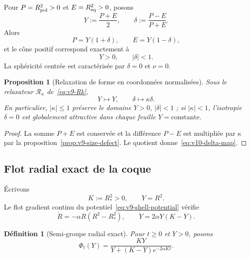 \documentclass[11pt,a4paper]{article}
\newtheorem{proposition}[theorem]{Proposition}
\newtheorem{definition}[theorem]{Définition}
\begin{document}
Pour $P=R_{\rm pol}^2>0$ et $E=R_{\rm eq}^2>0$, posons
\begin{equation}\label{eq:v10-Ydelta}
 Y:=\frac{P+E}{2},\qquad
 \delta:=\frac{P-E}{P+E}.
\end{equation}
Alors
\begin{equation}\label{eq:v10-PEfromYd}
 P=Y(1+\delta),\qquad E=Y(1-\delta),
\end{equation}
et le cône positif correspond exactement à
\[
 Y>0,\qquad |\delta|<1.
\]
La sphéricité centrée est caractérisée par $\delta=0$ et $\nu=0$.

\begin{proposition}[Relaxation de forme en coordonnées normalisées]\label{prop:v10-delta-relax}
Sous le relaxateur $\mathcal R_\kappa$ de~\eqref{eq:v9-Rk},
\begin{equation}\label{eq:v10-delta-map}
 \boxed{Y\mapsto Y,\qquad \delta\mapsto\kappa\delta.}
\end{equation}
En particulier, $|\kappa|\le1$ préserve le domaine $Y>0$, $|\delta|<1$ ; si $|\kappa|<1$, l'isotropie $\delta=0$ est globalement attractive dans chaque feuille $Y=\mathrm{constante}$.
\end{proposition}

\begin{proof}
La somme $P+E$ est conservée et la différence $P-E$ est multipliée par $\kappa$ par la proposition~\ref{prop:v9-size-defect}. Le quotient donne~\eqref{eq:v10-delta-map}.
\end{proof}

\subsection{Flot radial exact de la coque}

Écrivons
\[
 K:=R_*^2>0,
 \qquad
 Y=R^2.
\]
Le flot gradient continu du potentiel~\eqref{eq:v9-shell-potential} vérifie
\begin{equation}\label{eq:v10-logistic-flow-ode}
 \dot R=-\alpha R(R^2-R_*^2),
 \qquad
 \dot Y=2\alpha Y(K-Y).
\end{equation}

\begin{definition}[Semi-groupe radial exact]\label{def:v10-Phi}
Pour $t\ge0$ et $Y>0$, posons
\begin{equation}\label{eq:v10-Phi}
 \boxed{
 \Phi_t(Y)
 =\frac{K Y}{Y+(K-Y)e^{-2\alpha Kt}}.}
\end{equation}
\end{definition}
\end{document}

